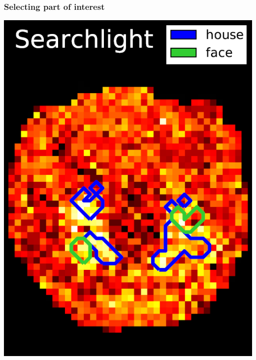 \documentclass{beamer}
\begin{document}
\begin{frame}
\frametitle{Selecting part of interest}
\begin{minipage}{.45\linewidth}
\centering
\includegraphics[scale=0.3]{searchlight.png}
\end{minipage}
\hfill
\begin{minipage}{.45\linewidth}
\centering

\end{minipage}
\end{frame}
\end{document}

